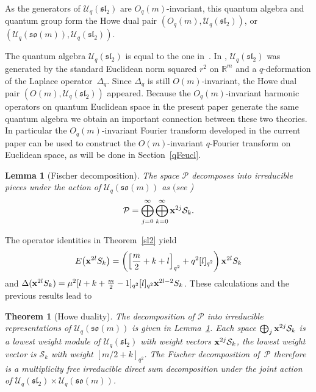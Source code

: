 \documentclass[11pt]{article}
\newtheorem{theorem}{Theorem}
\newtheorem{lemma}{Lemma}
\newcommand{\mR}{\mathbb{R}}
\newcommand{\cP}{\mathcal{P}}
\newcommand{\cS}{\mathcal{S}}
\newcommand{\cU}{\mathcal{U}}
\numberwithin{equation}{section}
\begin{document}
\begin{remark}
As the generators of $\cU_q(\mathfrak{sl}_2)$ are $O_q(m)$-invariant, this quantum algebra and quantum group form the Howe dual pair $(O_q(m),\cU_q(\mathfrak{sl}_2))$, or $(\cU_q(\mathfrak{so}(m)),\cU_q(\mathfrak{sl}_2))$.
\end{remark}

The quantum algebra $\cU_q(\mathfrak{sl}_2)$ is equal to the one in~\cite{MR2595267}. In \cite{MR2595267}, $\cU_q(\mathfrak{sl}_2)$ was generated by the standard Euclidean norm squared $r^2$ on $\mR^m$ and a $q$-deformation of the Laplace operator~$\Delta_q$. Since $\Delta_q$ is still $O(m)$-invariant, the Howe dual pair $(O(m),\cU_q(\mathfrak{sl}_2))$ appeared. Because the $O_q(m)$-invariant harmonic operators on quantum Euclidean space in the present paper generate the same quantum algebra we obtain an important connection between these two theories. In particular the $O_q(m)$-invariant Fourier transform developed in the current paper can be used to construct the $O(m)$-invariant $q$-Fourier transform on Euclidean space, as will be done in Section~\ref{qFeucl}.

\begin{lemma}[Fischer decomposition]
\label{Fischer}
The space $\cP$ decomposes into irreducible pieces under the action of $\cU_q(\mathfrak{so}(m))$ as $($see {\rm \cite{MR2006509, MR1328733})}
\begin{gather*}
\cP=\bigoplus_{j=0}^{\infty}\bigoplus_{k=0}^\infty\bold{x}^{2j}\cS_{k}.
\end{gather*}
\end{lemma}


The operator identities in Theorem~\ref{sl2} yield
\begin{gather*}
E\big(\bold{x}^{2l}S_k\big)=\left(\left[\frac{m}{2}+k+l\right]_{q^2}+q^2[l]_{q^2}\right)\bold{x}^{2l}S_k
\end{gather*}
and $\Delta(\bold{x}^{2l}S_k)=\mu^2[l+k+\frac{m}{2}-1]_{q^2}[l]_{q^2}\bold{x}^{2l-2}S_k$. These calculations and the previous results lead to
\begin{theorem}[Howe duality]\sloppy
The decomposition of $\cP$ into irreducible representations of $\cU_q(\mathfrak{so}(m))$ is given in Lemma~{\rm \ref{Fischer}}. Each space $\bigoplus_j \bold{x}^{2j}\cS_k$ is a lowest weight module of $\cU_q(\mathfrak{sl}_2)$ with weight vectors $\bold{x}^{2j}\cS_k$, the lowest weight vector is $\cS_k$ with weight $[m/2+k]_{q^2}$. The Fischer decomposition of~$\cP$ therefore is a multiplicity free irreducible direct sum decomposition under the joint action of $\cU_q(\mathfrak{sl}_2)\times\cU_q(\mathfrak{so}(m))$.
\end{theorem}
\end{document}
